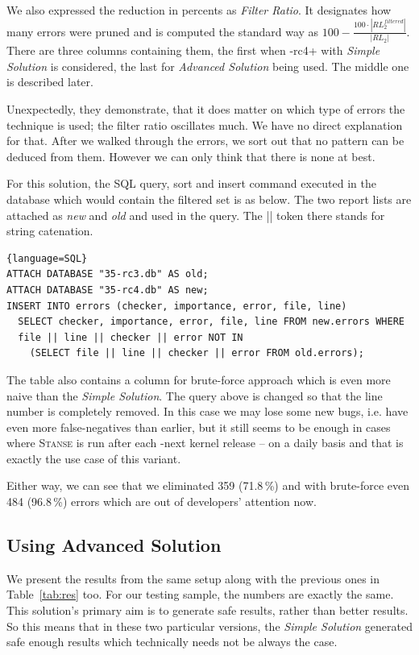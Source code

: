 \documentclass{acm_proc_article-sp}
\newcommand\st{\textsc{Stanse}\xspace}
\begin{document}
We also expressed the reduction in percents as \emph{Filter Ratio}.  It
designates how many errors were pruned and is computed the standard way as
$100-\frac{100\cdot |RL_2^{filtered}|}{|RL_2|}$. There are three columns
containing them, the first when -rc4+ with \emph{Simple Solution} is
considered, the last for \emph{Advanced Solution} being used. The middle one
is described later.

Unexpectedly, they demonstrate, that it does matter on which type of errors
the technique is used; the filter ratio oscillates much. We have no direct
explanation for that. After we walked through the errors, we sort out that no
pattern can be deduced from them. However we can only think that there is none
at best.

For this solution, the SQL query, sort and insert command executed in the
database which would contain the filtered set is as below. The two report
lists are attached as \emph{new} and \emph{old} and used in the query. The ||
token there stands for string catenation.
\begin{lstlisting}{language=SQL}
ATTACH DATABASE "35-rc3.db" AS old;
ATTACH DATABASE "35-rc4.db" AS new;
INSERT INTO errors (checker, importance, error, file, line)
  SELECT checker, importance, error, file, line FROM new.errors WHERE
  file || line || checker || error NOT IN
    (SELECT file || line || checker || error FROM old.errors);
\end{lstlisting}

The table also contains a column for brute-force approach which is even more
naive than the \emph{Simple Solution}. The query above is changed so that the
line number is completely removed. In this case we may lose some new bugs,
i.e.  have even more false-negatives than earlier, but it still seems to be
enough in cases where \st is run after each -next kernel release -- on a daily
basis and that is exactly the use case of this variant.

Either way, we can see that we eliminated 359 (71.8\,\%) and with brute-force
even 484 (96.8\,\%) errors which are out of developers' attention now.

\subsection{Using Advanced Solution}
We present the results from the same setup along with the previous ones in
Table~\ref{tab:res} too. For our testing sample, the numbers are exactly the
same. This solution's primary aim is to generate safe results, rather than
better results. So this means that in these two particular versions, the
\emph{Simple Solution} generated safe enough results which technically needs
not be always the case.
\end{document}
